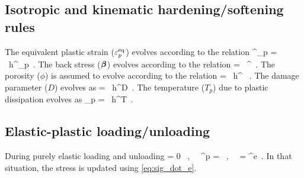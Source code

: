 \subsection{Isotropic and kinematic hardening/softening rules}
The equivalent plastic strain ($\varepsilon_p^{\text{eq}}$) evolves according to the relation
\Beq
  \dot{\Veps}^\Teq_p = \dot{\lambda}~h^{\Veps_p} \,.
\Eeq
The back stress ($\boldsymbol{\beta}$) evolves according to the relation
\Beq
  \dot{\Bbeta} = \dot{\lambda}~\Bh^{\beta} \,.
\Eeq
The porosity ($\phi$) is assumed to evolve according to the relation
\Beq
  \dot{\phi} = \dot{\lambda}~h^{\phi} ~.
\Eeq
The damage parameter ($D$) evolves as
\Beq
   = \dot{\lambda}~h^D \,.
\Eeq
The temperature ($T_p$) due to plastic dissipation evolves as
\Beq
  _p = \dot{\lambda}~h^T \,.
\Eeq

\subsection{Elastic-plastic loading/unloading}
During purely elastic loading and unloading
\Beq
  \dot{\lambda} = 0 ~,~~ \dot{\BVeps}^p = \Bzero ~,~~ \dot{\BVeps} = \dot{\BVeps}^e \,.
\Eeq
In that situation, the stress is updated using \eqref{eq:sig_dot_e}.

